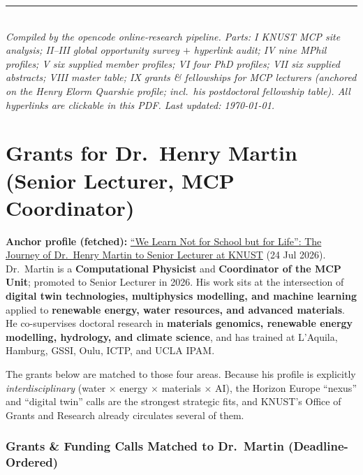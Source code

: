 \documentclass[11pt,a4paper]{article}
\begin{document}
\bigskip
\noindent\rule{\textwidth}{0.4pt}\\
\small\emph{Compiled by the opencode online-research pipeline. Parts: I KNUST MCP site analysis; II--III global opportunity survey $+$ hyperlink audit; IV nine MPhil profiles; V six supplied member profiles; VI four PhD profiles; VII six supplied abstracts; VIII master table; IX grants \& fellowships for MCP lecturers (anchored on the Henry Elorm Quarshie profile; incl.\ his postdoctoral fellowship table). All hyperlinks are clickable in this PDF. Last updated: \today.}



\newpage
\part{Grants for Dr.\ Henry Martin (Senior Lecturer, MCP Coordinator)}

\noindent\textbf{Anchor profile (fetched):} \href{https://physics.knust.edu.gh/news/news-articles/we-learn-not-school-life-journey-dr-henry-martin-senior-lecturer-knust}{``We Learn Not for School but for Life'': The Journey of Dr.\ Henry Martin to Senior Lecturer at KNUST} (24 Jul 2026). Dr.\ Martin is a \textbf{Computational Physicist} and \textbf{Coordinator of the MCP Unit}; promoted to Senior Lecturer in 2026. His work sits at the intersection of \textbf{digital twin technologies, multiphysics modelling, and machine learning} applied to \textbf{renewable energy, water resources, and advanced materials}. He co-supervises doctoral research in \textbf{materials genomics, renewable energy modelling, hydrology, and climate science}, and has trained at L'Aquila, Hamburg, GSSI, Oulu, ICTP, and UCLA IPAM.

The grants below are matched to those four areas. Because his profile is explicitly \emph{interdisciplinary} (water $\times$ energy $\times$ materials $\times$ AI), the Horizon Europe ``nexus'' and ``digital twin'' calls are the strongest strategic fits, and KNUST's Office of Grants and Research already circulates several of them.

\section{Grants \& Funding Calls Matched to Dr.\ Martin (Deadline-Ordered)}
\end{document}
